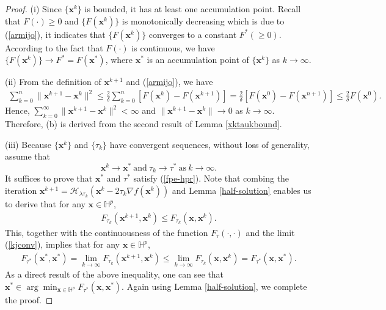 \documentclass{article}
\numberwithin{equation}{section}
\begin{document}
\begin{proof}
(i) Since  $\{\mathbf{x}^{k}\}$ is bounded, it has at least one accumulation point. 
Recall that $F(\cdot)\geq0$ and  $\{F(\mathbf{x}^{k})\}$ is monotonically decreasing which is due to (\ref{armijo}), it indicates that $\{F(\mathbf{x}^{k})\}$ converges to a constant $F^*(\geq0)$. 
According to the fact that $F(\cdot)$ is continuous, we have $\{F(\mathbf{x}^{k})\}\to{}F^*=F(\mathbf{x}^*)$, where $\mathbf{x}^*$ is an accumulation point of $\{\mathbf{x}^{k}\}$ as $k\to\infty.$

(ii) From the definition of $\mathbf{x}^{k+1}$ and (\ref{armijo}), we have
$$\begin{aligned}
	\sum_{k=0}^n\|\mathbf{x}^{k+1}-\mathbf{x}^{k}\|^2\leq\frac{2}{\delta}\sum_{k=0}^n[F(\mathbf{x}^{k})-F(\mathbf{x}^{k+1})]
	=\frac{2}{\delta}[F(\mathbf{x}^{0})-F(\mathbf{x}^{n+1})]
	\leq\frac{2}{\delta}F(\mathbf{x}^{0}).
\end{aligned}$$
Hence, $\sum_{k=0}^\infty\|\mathbf{x}^{k+1}-\mathbf{x}^{k}\|^2<\infty$ and $\|\mathbf{x}^{k+1}-\mathbf{x}^{k}\|\to0$ as $k\to\infty$.
Therefore, (b) is derived from the second result of Lemma \ref{xktaukbound}.

(iii) Because  $\{\mathbf{x}^{k}\}$ and $\{\tau_k\}$ have convergent sequences, without loss of generality, assume that
\begin{equation}\label{kjconv}
	\mathbf{x}^{k}\to\mathbf{x}^*~\mathrm{and}~ {\tau_k}\to\tau^*~\mbox{as}~k\to\infty.\end{equation}
It suffices to prove that
$\mathbf{x}^*$ and $\tau^*$ satisfy (\ref{fpe-hpr}). Note that combing the iteration $\mathbf{x}^{k+1}=\mathcal{H}_{\lambda\tau_k}(\mathbf{x}^k-2\tau_k\nabla f(\mathbf{x}^k))$ and Lemma \ref{half-solution} enables us to derive that for any $\mathbf{x}\in\mathbb{H}^p$,
\begin{equation}\label{iii}
	\begin{aligned}
		F_{\tau_k}(\mathbf{x}^{k+1},\mathbf{x}^k)\leq F_{\tau_k}(\mathbf{x},\mathbf{x}^k).\nonumber
	\end{aligned}
\end{equation}
This, together with the continuousness of the function $ F_{\tau}(\cdot,\cdot)$ and the limit (\ref{kjconv}), implies that for any $\mathbf{x}\in\mathbb{H}^p$,
\begin{equation}\label{iii}
	\begin{aligned}
		F_{\tau^*}(\mathbf{x}^{*},\mathbf{x}^{*})=\lim_{k\to\infty}F_{\tau_k}(\mathbf{x}^{k+1},\mathbf{x}^k)\leq \lim_{k\to\infty}F_{\tau_k}(\mathbf{x},\mathbf{x}^k)=F_{\tau^*}(\mathbf{x},\mathbf{x}^{*}).\nonumber
	\end{aligned}
\end{equation}
As a direct result of the above inequality, one can see that $\mathbf{x}^{*}\in\arg\min_{\mathbf{x}\in\mathbb{H}^p}F_{\tau^*}(\mathbf{x},\mathbf{x}^{*})$. Again using Lemma \ref{half-solution}, we complete the proof.   \end{proof}
\end{document}
